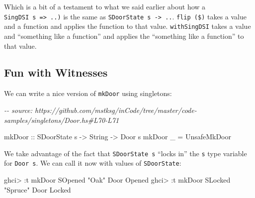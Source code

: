 \documentclass[]{article}
\newenvironment{Shaded}{}{}
\newcommand{\CommentTok}[1]{\textcolor[rgb]{0.38,0.63,0.69}{\textit{#1}}}
\newcommand{\DataTypeTok}[1]{\textcolor[rgb]{0.56,0.13,0.00}{#1}}
\newcommand{\FunctionTok}[1]{\textcolor[rgb]{0.02,0.16,0.49}{#1}}
\newcommand{\NormalTok}[1]{#1}
\newcommand{\OperatorTok}[1]{\textcolor[rgb]{0.40,0.40,0.40}{#1}}
\newcommand{\OtherTok}[1]{\textcolor[rgb]{0.00,0.44,0.13}{#1}}
\newcommand{\StringTok}[1]{\textcolor[rgb]{0.25,0.44,0.63}{#1}}
\begin{document}
\begin{Shaded}
\end{Shaded}

Which is a bit of a testament to what we said earlier about how a
\texttt{SingDSI\ s\ =\textgreater{}\ ..)} is the same as
\texttt{SDoorState\ s\ -\textgreater{}\ ..}. \texttt{flip\ (\$)} takes a value
and a function and applies the function to that value. \texttt{withSingDSI}
takes a value and ``something like a function'' and applies the ``something like
a function'' to that value.

\subsection{Fun with Witnesses}\label{fun-with-witnesses}

We can write a nice version of \texttt{mkDoor} using singletons:

\begin{Shaded}
\begin{Highlighting}[]
\CommentTok{{-}{-} source: https://github.com/mstksg/inCode/tree/master/code{-}samples/singletons/Door.hs\#L70{-}L71}

\OtherTok{mkDoor ::} \DataTypeTok{SDoorState}\NormalTok{ s }\OtherTok{{-}\textgreater{}} \DataTypeTok{String} \OtherTok{{-}\textgreater{}} \DataTypeTok{Door}\NormalTok{ s}
\NormalTok{mkDoor \_ }\OtherTok{=} \DataTypeTok{UnsafeMkDoor}
\end{Highlighting}
\end{Shaded}

We take advantage of the fact that \texttt{SDoorState\ s} ``locks in'' the
\texttt{s} type variable for \texttt{Door\ s}. We can call it now with values of
\texttt{SDoorState}:

\begin{Shaded}
\begin{Highlighting}[]
\NormalTok{ghci}\OperatorTok{\textgreater{}} \OperatorTok{:}\NormalTok{t mkDoor }\DataTypeTok{SOpened} \StringTok{"Oak"}
\DataTypeTok{Door} \DataTypeTok{\textquotesingle{}Opened}
\NormalTok{ghci}\OperatorTok{\textgreater{}} \OperatorTok{:}\NormalTok{t mkDoor }\DataTypeTok{SLocked} \StringTok{"Spruce"}
\DataTypeTok{Door} \DataTypeTok{\textquotesingle{}Locked}
\end{Highlighting}
\end{Shaded}
\end{document}
